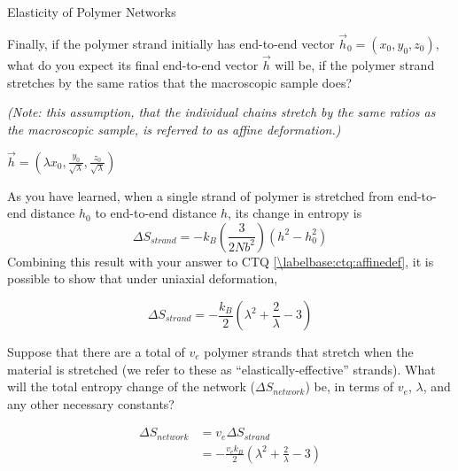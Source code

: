 \begin{activity}{Elasticity of Polymer Networks}
\begin{ctqs}
\begin{enumerate}
			\end{enumerate}
	
	\question Finally, if the polymer strand initially has end-to-end vector $\vec h_0 = (x_0, y_0, z_0)$, what do you expect its final end-to-end vector $\vec h$ will be, if the polymer strand stretches by the same ratios that the macroscopic sample does?  \label{\labelbase:ctq:affinedef}
			
			\emph{(Note: this assumption, that the individual chains stretch by the same ratios as the macroscopic sample, is referred to as \emph{affine deformation}.)}
		
			\begin{solution}[0.75in]{}
				$\vec h = (\lambda x_0, \frac{y_0}{\sqrt{\lambda}}, \frac{z_0}{\sqrt{\lambda}})$
			\end{solution}
				
\end{ctqs}

\begin{infobox}

	As you have learned, when a single strand of polymer is stretched from end-to-end distance $h_0$ to end-to-end distance $h$, its change in entropy is 
			\begin{equation*}
				\Delta S_{strand} = -k_B\left(\frac{3}{2Nb^2}\right)(h^2 - h_0^2)
			\end{equation*}
	Combining this result with your answer to CTQ \ref{\labelbase:ctq:affinedef}, it is possible to show that under uniaxial deformation,
	
		\begin{equation*}	
				\Delta S_{strand} = -\frac{k_B}{2}\left(\lambda^2 + \frac{2}{\lambda} - 3\right)
			\label{\labelbase:eqn:delSstranduniaxial}
		\end{equation*}
			
\end{infobox}

\begin{ctqs}
		
	\question Suppose that there are a total of $v_e$ polymer strands that stretch when the material is stretched (we refer to these as ``elastically-effective'' strands). What will the total entropy change of the network ($\Delta S_{network}$) be, in terms of $v_e$, $\lambda$, and any other necessary constants?
		
			\begin{solution}[1.25in]{}
				\begin{align*}
					\Delta S_{network} &= v_e \Delta S_{strand}\\
						&= -\frac{v_e k_B}{2}\left(\lambda^2 + \frac{2}{\lambda} - 3\right)
				\end{align*}
			\end{solution}
		

\end{ctqs}
\end{activity}
